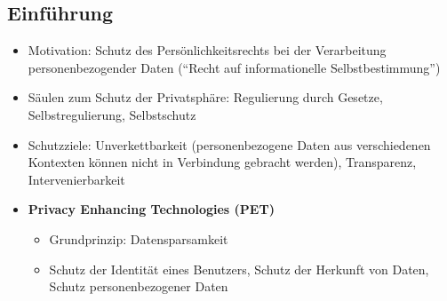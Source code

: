\subsection{Einführung}
\begin{itemize}
	\item Motivation: Schutz des Persönlichkeitsrechts bei der Verarbeitung personenbezogender Daten ("`Recht auf informationelle Selbstbestimmung"')
	\item Säulen zum Schutz der Privatsphäre: Regulierung durch Gesetze, Selbstregulierung, Selbstschutz
	\item Schutzziele: Unverkettbarkeit (personenbezogene Daten aus verschiedenen Kontexten können nicht in Verbindung gebracht werden), Transparenz, Intervenierbarkeit
	\item \textbf{Privacy Enhancing Technologies (PET)}
	\begin{itemize}
		\item Grundprinzip: Datensparsamkeit
		\item Schutz der Identität eines Benutzers, Schutz der Herkunft von Daten, Schutz personenbezogener Daten
	\end{itemize}
\end{itemize}



